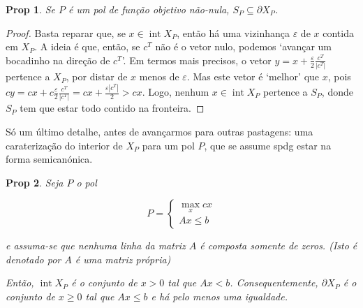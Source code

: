 \documentclass{article}
\DeclareMathOperator{\interior}{int}
\newtheorem{prop}{Prop}
\theoremstyle{definition}
\begin{document}
	\begin{prop}
	Se $P$ é um pol de função objetivo não-nula, $S_P \subseteq \partial X_P$.
	\end{prop}
	
	\begin{proof}
	Basta reparar que, se $x \in \interior  X_P$, então há uma vizinhança $\varepsilon$ de $x$ contida em $X_P$. A ideia é que, então, se $c^T$ não é o vetor nulo, podemos `avançar um bocadinho na direção de $c^T$'. Em termos mais precisos, o vetor $y = x + \frac \varepsilon 2 \frac{c^T}{\lvert c^T \rvert}$ pertence a $X_P$, por distar de $x$ menos de $\varepsilon$. Mas este vetor é `melhor' que $x$, pois $cy = cx + c \frac \varepsilon 2 \frac {c^T}{\lvert c^T \rvert} = cx + \frac{\varepsilon |c^T|} 2 > cx$. Logo, nenhum $x \in \interior X_P$ pertence a $S_P$, donde $S_P$ tem que estar todo contido na fronteira.
	\end{proof}
	
	Só um último detalhe, antes de avançarmos para outras pastagens: uma caraterização do interior de $X_P$ para um pol $P$, que se assume spdg estar na forma semicanónica.
	
	\begin{prop}
	Seja $P$ o pol
	
	\[
	P =
	\begin{cases}
	\max\limits_x cx\\
	Ax \leq b
	\end{cases}
	\]
	
	e assuma-se que nenhuma linha da matriz $A$ é composta somente de zeros. (Isto é denotado por \emph{$A$ é uma matriz própria})
	
	Então, $\interior X_P$ é o conjunto de $x > 0$ tal que $Ax < b$. Consequentemente, $\partial X_P$ é o conjunto de $x \geq 0$ tal que $Ax \leq b$ e há pelo menos uma igualdade.
	\end{prop}
	
\end{document}
